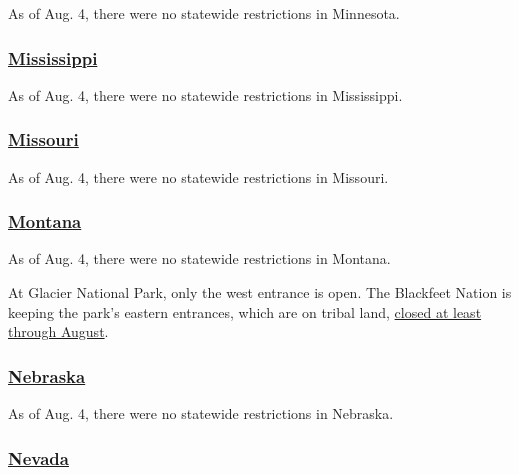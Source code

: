 As of Aug. 4, there were no statewide restrictions in Minnesota.

\hypertarget{mississippi}{%
\subsubsection{\texorpdfstring{\href{https://visitmississippi.org/covid-19-travel-alert/}{Mississippi}}{Mississippi}}\label{mississippi}}

As of Aug. 4, there were no statewide restrictions in Mississippi.

\hypertarget{missouri}{%
\subsubsection{\texorpdfstring{\href{https://www.visitmo.com/travel-updates}{Missouri}}{Missouri}}\label{missouri}}

As of Aug. 4, there were no statewide restrictions in Missouri.

\hypertarget{montana}{%
\subsubsection{\texorpdfstring{\href{https://www.visitmt.com/travel-alerts.html}{Montana}}{Montana}}\label{montana}}

As of Aug. 4, there were no statewide restrictions in Montana.

At Glacier National Park, only the west entrance is open. The Blackfeet
Nation is keeping the park's eastern entrances, which are on tribal
land,
\href{https://www.washingtonpost.com/national/a-closed-border-pandemic-weary-tourists-and-a-big-bottleneck-at-glacier-national-park/2020/07/10/607694f2-c2c0-11ea-b4f6-cb39cd8940fb_story.html}{closed
at least through August}.

\hypertarget{nebraska}{%
\subsubsection{\texorpdfstring{\href{http://dhhs.ne.gov/Pages/COVID-19-Traveler-Recommendations.aspx}{Nebraska}}{Nebraska}}\label{nebraska}}

As of Aug. 4, there were no statewide restrictions in Nebraska.

\hypertarget{nevada}{%
\subsubsection{\texorpdfstring{\href{https://nvhealthresponse.nv.gov/info/travelers-visitors/}{Nevada}}{Nevada}}\label{nevada}}

